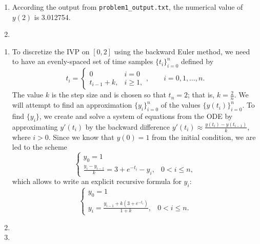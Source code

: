 \documentclass{homework}
\begin{document}
\begin{arabicparts}
\begin{enumerate}[label=({\bf\alph*})]
			\item According the output from \lstinline{problem1_output.txt}, the numerical value of $y(2)$ is 3.012754.
			\item
		\end{enumerate}
		
		\questionpart
		\begin{enumerate}[label=({\bf\alph*})]
			\item To discretize the IVP on $[0,2]$ using the backward Euler method, we need to have an evenly-spaced set of time samples $\{t_i\}_{i=0}^n$ defined by
			\begin{equation}
				t_i = \begin{cases}
					0 & i = 0 \\
					t_{i-1} + k, & i \ge 1,
				\end{cases}, \qquad i = 0,1,\dots,n.
			\end{equation}
			The value $k$ is the step size and is chosen so that $t_n = 2$; that is, $k = \frac{2}{n}$. We will attempt to find an approximation $\{y_i\}_{i=0}^n$ of the values $\{y(t_i)\}_{i=0}^n$. To find $\{y_i\}$, we create and solve a system of equations from the ODE by approximating $y'(t_i)$ by the backward difference $y'(t_i) \approx \frac{y(t_i) - y(t_{i-1})}{k}$, where $i > 0$. Since we know that $y(0) = 1$ from the initial condition, we are led to the scheme
			\begin{equation}
				\begin{cases}
					y_0 = 1 &\\
					\frac{y_i - y_{i-1}}{k} = 3 + e^{-t_i} - y_i, & 0 < i \le n,
				\end{cases}
			\end{equation}
			which allows to write an explicit recursive formula for $y_i$:
			\begin{equation}
				\begin{cases}
					y_0 = 1 &\\
					y_i = \frac{y_{i-1} + k(3 + e^{-t_i})}{1+k}, & 0 < i \le n.
				\end{cases}
			\end{equation}
			
			\item 
			\item
		\end{enumerate}
		
		\questionpart 
	\end{arabicparts}
	
	\question
	
\end{document}
